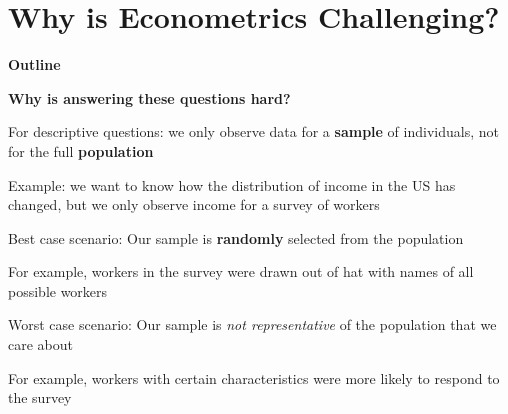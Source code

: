\documentclass[11pt, aspectratio=169]{beamer}
\newenvironment{wideitemize}{\itemize\addtolength{\itemsep}{5pt}}{\enditemize}
\begin{document}
\section{Why is Econometrics Challenging?}
	\begin{frame}{\bf \large Outline}
	\tableofcontents[currentsection]
\end{frame}
\begin{frame}{\bf \large Why is answering these questions hard?}

\begin{wideitemize}
\item
For descriptive questions: we only observe data for a \textbf{sample} of individuals, not for the full \textbf{population}
	\begin{wideitemize}
		\item 
		Example: we want to know how the distribution of income in the US has changed, but we only observe income for a survey of workers
	\end{wideitemize}

\item Best case scenario: Our sample is \textbf{randomly} selected from the population \\
	\begin{wideitemize}
		\item 
		For example, workers in the survey were drawn out of hat with names of all possible workers

	\end{wideitemize}


\item Worst case scenario: Our sample is \textit{not representative} of the population that we care about
	\begin{wideitemize}
		\item For example, workers with certain characteristics were more likely to respond to the survey
	\end{wideitemize}
\end{wideitemize}

\end{frame}
\end{document}
